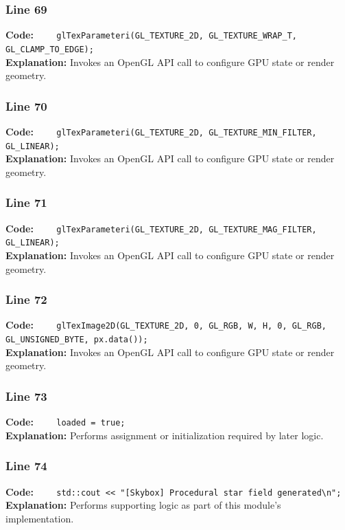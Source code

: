 \documentclass[11pt,a4paper]{article}
\begin{document}
\subsubsection*{Line 69}
\textbf{Code:} \verb|    glTexParameteri(GL_TEXTURE_2D, GL_TEXTURE_WRAP_T, GL_CLAMP_TO_EDGE);|\\
\textbf{Explanation:} Invokes an OpenGL API call to configure GPU state or render geometry.

\subsubsection*{Line 70}
\textbf{Code:} \verb|    glTexParameteri(GL_TEXTURE_2D, GL_TEXTURE_MIN_FILTER, GL_LINEAR);|\\
\textbf{Explanation:} Invokes an OpenGL API call to configure GPU state or render geometry.

\subsubsection*{Line 71}
\textbf{Code:} \verb|    glTexParameteri(GL_TEXTURE_2D, GL_TEXTURE_MAG_FILTER, GL_LINEAR);|\\
\textbf{Explanation:} Invokes an OpenGL API call to configure GPU state or render geometry.

\subsubsection*{Line 72}
\textbf{Code:} \verb|    glTexImage2D(GL_TEXTURE_2D, 0, GL_RGB, W, H, 0, GL_RGB, GL_UNSIGNED_BYTE, px.data());|\\
\textbf{Explanation:} Invokes an OpenGL API call to configure GPU state or render geometry.

\subsubsection*{Line 73}
\textbf{Code:} \verb|    loaded = true;|\\
\textbf{Explanation:} Performs assignment or initialization required by later logic.

\subsubsection*{Line 74}
\textbf{Code:} \verb|    std::cout << "[Skybox] Procedural star field generated\n";|\\
\textbf{Explanation:} Performs supporting logic as part of this module's implementation.
\end{document}
